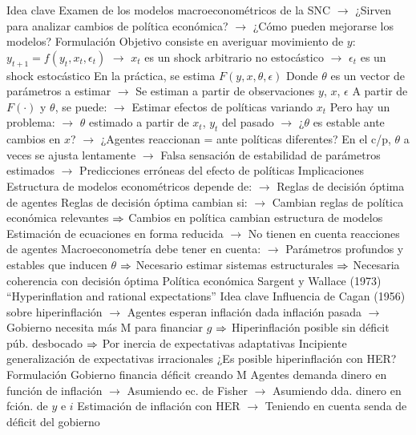 \documentclass{nuevotema}
\begin{document}
\begin{esquemal}
				\4 Idea clave
				\4[] Examen de los modelos macroeconométricos de la SNC
				\4[] $\to$ ¿Sirven para analizar cambios de política económica?
				\4[] $\to$ ¿Cómo pueden mejorarse los modelos?
				\4 Formulación
				\4[] Objetivo consiste en averiguar movimiento de $y$:
				\4[] $y_{t+1} = f(y_t, x_t, \epsilon_t)$
				\4[] $\to$ $x_t$ es un shock arbitrario no estocástico
				\4[] $\to$ $\epsilon_t$ es un shock estocástico
				\4[] En la práctica, se estima $F(y,x, \theta, \epsilon)$
				\4[] Donde $\theta$ es un vector de parámetros a estimar
				\4[] $\to$ Se estiman a partir de observaciones $y$, $x$, $\epsilon$
				\4[] A partir de $F(\cdot)$ y $\theta$, se puede:
				\4[] $\to$ Estimar efectos de políticas variando $x_t$
				\4[] Pero hay un problema:
				\4[] $\to$ $\theta$ estimado a partir de $x_t$, $y_t$ del pasado
				\4[] $\to$ ¿$\theta$ es estable ante cambios en $x$?
				\4[] $\to$ ¿Agentes reaccionan = ante políticas diferentes?
				\4[] En el c/p, $\theta$ a veces se ajusta lentamente
				\4[] $\to$ Falsa sensación de estabilidad de parámetros estimados
				\4[] $\to$ Predicciones erróneas del efecto de políticas
				\4 Implicaciones
				\4[] Estructura de modelos econométricos depende de:
				\4[] $\to$ Reglas de decisión óptima de agentes
				\4[] Reglas de decisión óptima cambian si:
				\4[] $\to$ Cambian reglas de política económica relevantes
				\4[] $\Rightarrow$ Cambios en política cambian estructura de modelos
				\4[] Estimación de ecuaciones en forma reducida
				\4[] $\to$ No tienen en cuenta reacciones de agentes
				\4[] Macroeconometría debe tener en cuenta:
				\4[] $\to$ Parámetros profundos y estables que inducen $\theta$
				\4[] $\Rightarrow$ Necesario estimar sistemas estructurales
				\4[] $\Rightarrow$ Necesaria coherencia con decisión óptima
		\2 Política económica
			\3 Sargent y Wallace (1973)
				\4 ``Hyperinflation and rational expectations''
				\4 Idea clave
				\4[] Influencia de Cagan (1956) sobre hiperinflación
				\4[] $\to$ Agentes esperan inflación dada inflación pasada
				\4[] $\to$ Gobierno necesita más M para financiar $g$
				\4[] $\Rightarrow$ Hiperinflación posible sin déficit púb. desbocado
				\4[] $\Rightarrow$ Por inercia de expectativas adaptativas
				\4[] Incipiente generalización de expectativas irracionales
				\4[] ¿Es posible hiperinflación con HER?
				\4 Formulación
				\4[] Gobierno financia déficit creando M
				\4[] Agentes demanda dinero en función de inflación
				\4[] $\to$ Asumiendo ec. de Fisher
				\4[] $\to$ Asumiendo dda. dinero en fción. de $y$ e $i$
				\4[] Estimación de inflación con HER
				\4[] $\to$ Teniendo en cuenta senda de déficit del gobierno

\end{esquemal}
\end{document}
